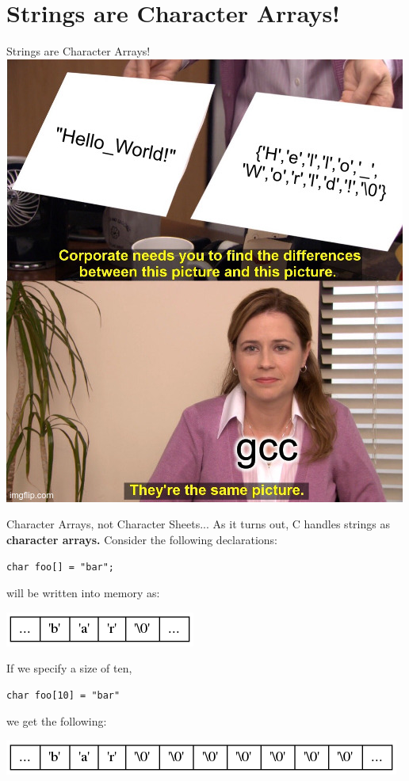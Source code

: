 \documentclass[11pt]{beamer}
\let\OldTexttt\texttt
\renewcommand{\texttt}[1]{\OldTexttt{\color{teal}{#1}}}
\begin{document}
\section[String]{Strings are Character Arrays!} 
\begin{frame}{Strings are Character Arrays!}
\center
\includegraphics[scale=0.3]{charArrays.jpg}
\end{frame}

\begin{frame}[fragile=singleslide]{Character Arrays, not Character Sheets...}
As it turns out, C handles strings as \textbf{character arrays.} Consider the following declarations:
\begin{lstlisting}[style=C]
char foo[] = "bar";
\end{lstlisting}
\texttt{foo} will be written into memory as:
\begin{center}
\includegraphics[scale=0.5]{graphs/string.png}
\end{center}
If we specify a size of ten,
\begin{lstlisting}[style=C]
char foo[10] = "bar"
\end{lstlisting}
 we get the following:
 \begin{center}
 \includegraphics[scale=0.5]{graphs/string2.png}
 \end{center}

\end{frame}
\end{document}
